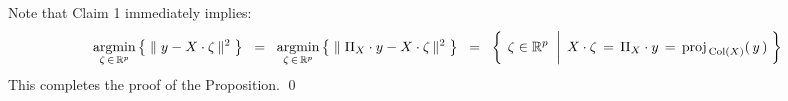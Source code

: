 \vskip 0.5cm
\noindent
Note that Claim 1 immediately implies:
\begin{equation*}
\underset{\zeta\,\in\,\Re^{p}}{\argmin}\left\{\;\Vert\;y - X \cdot \zeta\,\Vert^{2}\;\right\}
\;\; = \;\;
\underset{\zeta\,\in\,\Re^{p}}{\argmin}\left\{\;\Vert\;\Pi_{X} \cdot y - X \cdot \zeta\,\Vert^{2}\;\right\}
\;\; = \;\;
\left\{\;
	\left.
	\zeta \overset{{\color{white}\vert}}{\in} \Re^{p}
	\;\;\right\vert\;
	X \cdot \zeta \,=\, \Pi_{X} \cdot y \,=\, \proj_{\,\Col(X)}(\,y\,)
	\;\right\}
\end{equation*}
This completes the proof of the Proposition.
\qed


